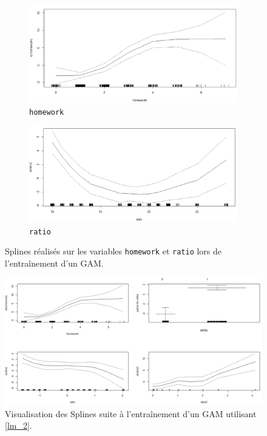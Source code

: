 \documentclass{article}
\begin{document}
\begin{figure}[H]  %
	\centering
	\begin{subfigure}{0.48\textwidth}
		\includegraphics[width=1\textwidth]{graphiques/Spline_Homework}
		\caption{\texttt{homework}}
		\label{Spline_Homework}
	\end{subfigure}
	\begin{subfigure}{0.48\textwidth}
		\includegraphics[width=1\textwidth]{graphiques/Spline_Ratio}
		\caption{\texttt{ratio}}
		\label{Spline_Ratio}
	\end{subfigure}
	\caption{Splines réalisés sur les variables \texttt{homework} et \texttt{ratio} lors de l'entraînement d'un GAM.}
	\label{Spline_lm1}
\end{figure}

\begin{figure}[H]  %
	\centering
	\includegraphics[width=1\textwidth]{graphiques/Splines2}
	\caption{Visualisation des Splines suite à l'entraînement d'un GAM utilisant \eqref{lm_2}.}
	\label{Spline_lm2}
\end{figure}
\end{document}
